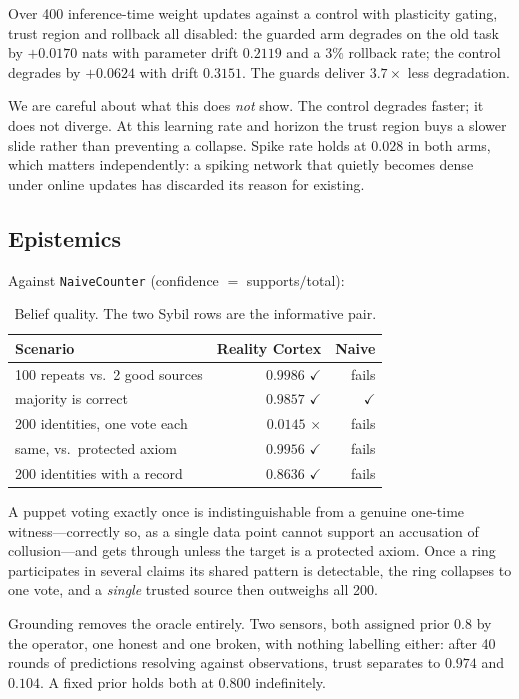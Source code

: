 \documentclass[10pt,twocolumn]{article}
\newcommand{\win}{\textbf{$\checkmark$}}
\newcommand{\lose}{$\times$}
\begin{document}
Over 400 inference-time weight updates against a control with plasticity
gating, trust region and rollback all disabled: the guarded arm degrades on the
old task by $+0.0170$ nats with parameter drift $0.2119$ and a $3\%$ rollback
rate; the control degrades by $+0.0624$ with drift $0.3151$. The guards deliver
$3.7\times$ less degradation.

We are careful about what this does \emph{not} show. The control degrades
faster; it does not diverge. At this learning rate and horizon the trust region
buys a slower slide rather than preventing a collapse. Spike rate holds at
$0.028$ in both arms, which matters independently: a spiking network that
quietly becomes dense under online updates has discarded its reason for
existing.

\subsection{Epistemics}

Against \texttt{NaiveCounter} (confidence $=$ supports$/$total):

\begin{table}[h]
\centering\small
\begin{tabular}{@{}lrr@{}}
\toprule
Scenario & Reality Cortex & Naive \\
\midrule
100 repeats vs.\ 2 good sources & $\mathbf{0.9986}$ \win & fails \\
majority is correct & $0.9857$ \win & \win \\
200 identities, one vote each & $0.0145$ \lose & fails \\
same, vs.\ protected axiom & $\mathbf{0.9956}$ \win & fails \\
200 identities with a record & $\mathbf{0.8636}$ \win & fails \\
\bottomrule
\end{tabular}
\caption{Belief quality. The two Sybil rows are the informative pair.}
\end{table}

A puppet voting exactly once is indistinguishable from a genuine one-time
witness---correctly so, as a single data point cannot support an accusation of
collusion---and gets through unless the target is a protected axiom. Once a
ring participates in several claims its shared pattern is detectable, the ring
collapses to one vote, and a \emph{single} trusted source then outweighs all
200.

Grounding removes the oracle entirely. Two sensors, both assigned prior $0.8$
by the operator, one honest and one broken, with nothing labelling either:
after 40 rounds of predictions resolving against observations, trust separates
to $0.974$ and $0.104$. A fixed prior holds both at $0.800$ indefinitely.
\end{document}

